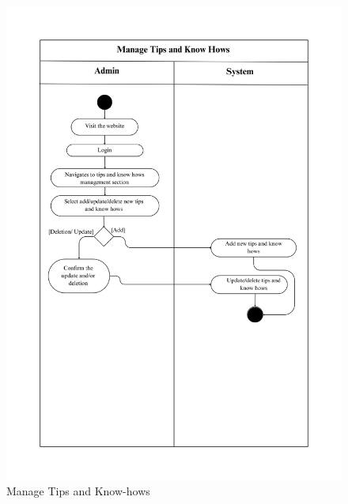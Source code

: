 \begin{figure}[h!]
    \centering
    \includegraphics[width=1\textwidth]{Images/Activity Diagrams/31 Manage Tips and Know Hows.png}
    \caption{Manage Tips and Know-hows}
    \label{fig:activity-manage-tips}
\end{figure}

